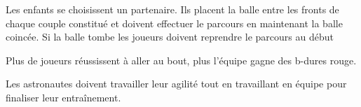 \documentclass{grand-jeu}
\begin{document}
\begin{liste-materiel}
\end{liste-materiel}

\begin{regles}
Les enfants se choisissent un partenaire. Ils placent la balle entre les fronts de chaque couple constitué et doivent effectuer le parcours en maintenant la balle coincée. Si la balle tombe les joueurs doivent reprendre le parcours au début

Plus de joueurs réussissent à aller au bout, plus l'équipe gagne des b-dures rouge.
\end{regles}

\begin{imaginaire}
Les astronautes doivent travailler leur agilité tout en travaillant en équipe pour finaliser leur entraînement. 
\end{imaginaire}

\begin{moments-stop}
\end{moments-stop}
\end{document}
